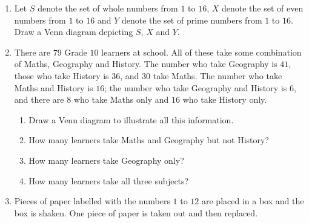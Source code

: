 \begin{exercises}{}
{
    \begin{enumerate}[itemsep=5pt, label=\textbf{\arabic*}. ]
   \item Let $S$ denote the set of whole numbers from $1$ to $16$, $X$
    denote the set of even numbers from $1$ to $16$ and $Y$ denote the
    set of prime numbers from $1$ to $16$. Draw a Venn diagram depicting $S$, $X$ and $Y$.
\item
  There are $79$ Grade $10$ learners at school. All of these
    take some combination of Maths, Geography and History. The number who take
    Geography is $41$, those who take History is $36$, and $30$ take
    Maths. The number who take Maths and History is $16$; the number
    who take Geography and History is $6$, and there are $8$ who take
    Maths only and $16$ who take History only.
    \begin{enumerate}[noitemsep, label=\textbf{(\alph*)} ]

    \item Draw a Venn diagram to illustrate all this information.
    \item How many learners take Maths and Geography but not History?
    \item How many learners take Geography only?
    \item How many learners take all three subjects?
    \end{enumerate}
 \item Pieces of paper labelled with the numbers $1$ to $12$ are
    placed in a box and the box is shaken. One piece of paper is taken
    out and then replaced.
    \begin{enumerate}[noitemsep, label=\textbf{(\alph*)} ]


\end{enumerate}
\end{enumerate}}
\end{exercises}
